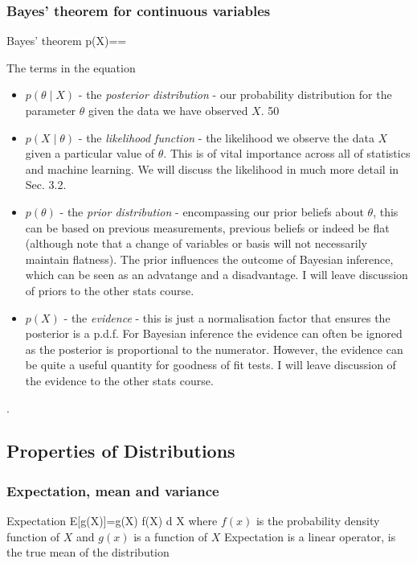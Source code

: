 \documentclass[12pt,a4paper]{article}
\begin{document}
\subsubsection{Bayes' theorem for continuous variables}
\begin{definition}
    {Bayes' theorem}
    {p(\theta \mid X)==}
    {The terms in the equation
    \begin{itemize}
        \item $p(\theta \mid X)$ - the \textit{posterior distribution} - our probability distribution for the parameter $\theta$ given the data we have observed $X$.
        50
        \item $p(X \mid \theta)$ - the \textit{likelihood function} - the likelihood we observe the data $X$ given a particular value of $\theta$. This is of vital importance across all of statistics and machine learning. We will discuss the likelihood in much more detail in Sec. 3.2.
        \item $p(\theta)$ - the \textit{prior distribution} - encompassing our prior beliefs about $\theta$, this can be based on previous measurements, previous beliefs or indeed be flat (although note that a change of variables or basis will not necessarily maintain flatness). The prior influences the outcome of Bayesian inference, which can be seen as an advatange and a disadvantage. I will leave discussion of priors to the other stats course.
        \item $p(X)$ - the \textit{evidence} - this is just a normalisation factor that ensures the posterior is a p.d.f. For Bayesian inference the evidence can often be ignored as the posterior is proportional to the numerator. However, the evidence can be quite a useful quantity for goodness of fit tests. I will leave discussion of the evidence to the other stats course.
    \end{itemize}.
    }
\end{definition}
\subsection{Properties of Distributions}
\subsubsection{Expectation, mean and variance}
\begin{definition}
    {Expectation}
    {E[g(X)]=\int g(X) f(X) d X}
    {where $f(x)$ is the probability density function of $X$ and $g(x)$ is a function of $X$
    Expectation is a linear operator, is the true mean of the distribution}
\end{definition}\\
\end{document}
